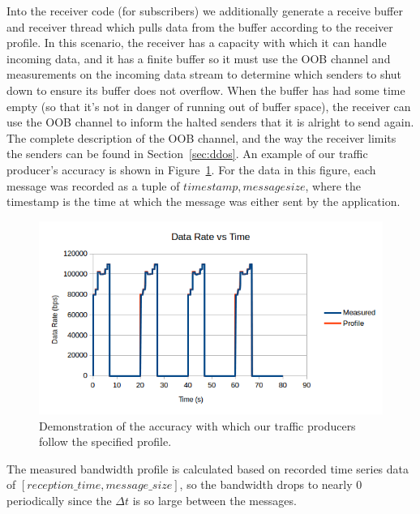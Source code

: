 Into the receiver code (for subscribers) we additionally generate a
receive buffer and receiver thread which pulls data from the buffer
according to the receiver profile.  In this scenario, the receiver has
a capacity with which it can handle incoming data, and it has a finite
buffer so it must use the OOB channel and measurements on the incoming
data stream to determine which senders to shut down to ensure its
buffer does not overflow.  When the buffer has had some time empty (so
that it's not in danger of running out of buffer space), the receiver
can use the OOB channel to inform the halted senders that it is
alright to send again.  The complete description of the OOB channel,
and the way the receiver limits the senders can be found in
Section~\ref{sec:ddos}.  An example of our traffic producer's accuracy
is shown in Figure~\ref{fig:generation}.  For the data in this figure,
each message was recorded as a tuple of $timestamp, message size$,
where the timestamp is the time at which the message was either sent
by the application.

\begin{figure}[ht!]
  \includegraphics[width=1.1\textwidth]{../doc/src/images/results/traffic_generation.png}
  \caption{Demonstration of the accuracy with which our traffic
    producers follow the specified profile.}
  \label{fig:generation}
\end{figure}

\iffalse

\begin{definition}[Note:]
The measured bandwidth profile is calculated based on
recorded time series data of $[reception\_time,
message\_size]$, so the bandwidth drops to nearly 0
periodically since the $\Delta t$ is so large between
the messages.
\end{definition}

